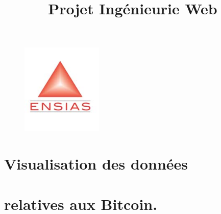\documentclass[12pt]{article}
\title{Projet Ingénieurie Web }
\date{}
\begin{document}
\maketitle



\begin{figure}[H]
\advance\leftskip -0.01in		\includegraphics[width=1.52in,height=1.72in]{./media/image1.png}
\end{figure}



\setlength{\parskip}{6.0pt}
\par


\vspace{\baselineskip}

\vspace{\baselineskip}

\vspace{\baselineskip}

\vspace{\baselineskip}
\par


\vspace{\baselineskip}

\vspace{\baselineskip}

\vspace{\baselineskip}
\chapter{Visualisation des données}\par

\chapter{relatives aux Bitcoin.}\par


\vspace{\baselineskip}
\end{document}
